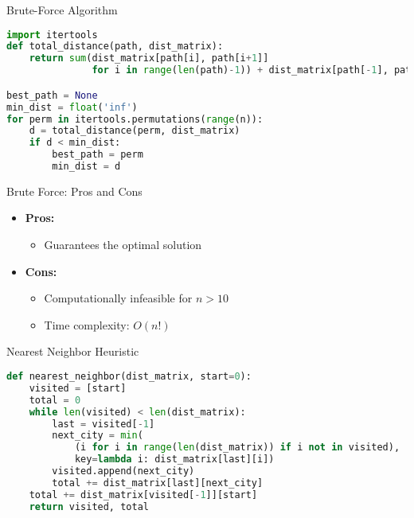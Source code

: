 \documentclass[mathserif,20pt,xcolor=table,compress,aspectratio=169]{beamer}
\begin{document}
\begin{frame}[fragile]{Brute-Force Algorithm}
\begin{lstlisting}[language=Python]
import itertools
def total_distance(path, dist_matrix):
    return sum(dist_matrix[path[i], path[i+1]]
               for i in range(len(path)-1)) + dist_matrix[path[-1], path[0]]

best_path = None
min_dist = float('inf')
for perm in itertools.permutations(range(n)):
    d = total_distance(perm, dist_matrix)
    if d < min_dist:
        best_path = perm
        min_dist = d
\end{lstlisting}
\end{frame}

\begin{frame}{Brute Force: Pros and Cons}
\begin{itemize}
    \item \textbf{Pros:}
    \begin{itemize}
        \item Guarantees the optimal solution
    \end{itemize}
    \item \textbf{Cons:}
    \begin{itemize}
        \item Computationally infeasible for $n > 10$
        \item Time complexity: $O(n!)$
    \end{itemize}
\end{itemize}
\end{frame}

\begin{frame}[fragile]{Nearest Neighbor Heuristic}
\begin{lstlisting}[language=Python]
def nearest_neighbor(dist_matrix, start=0):
    visited = [start]
    total = 0
    while len(visited) < len(dist_matrix):
        last = visited[-1]
        next_city = min(
            (i for i in range(len(dist_matrix)) if i not in visited),
            key=lambda i: dist_matrix[last][i])
        visited.append(next_city)
        total += dist_matrix[last][next_city]
    total += dist_matrix[visited[-1]][start]
    return visited, total
\end{lstlisting}
\end{frame}
\end{document}
